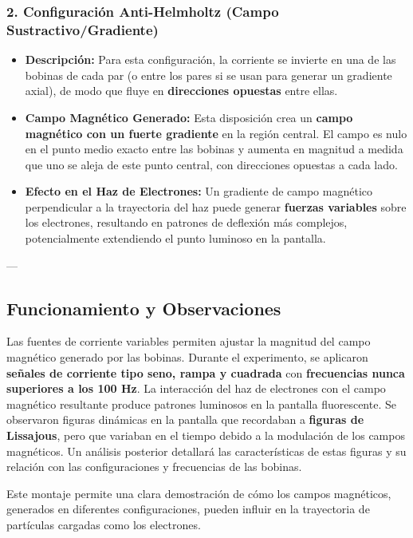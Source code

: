 \subsubsection{2. Configuración Anti-Helmholtz (Campo Sustractivo/Gradiente)}
\begin{itemize}
    \item \textbf{Descripción:} Para esta configuración, la corriente se invierte en una de las bobinas de cada par (o entre los pares si se usan para generar un gradiente axial), de modo que fluye en \textbf{direcciones opuestas} entre ellas.
    \item \textbf{Campo Magnético Generado:} Esta disposición crea un \textbf{campo magnético con un fuerte gradiente} en la región central. El campo es nulo en el punto medio exacto entre las bobinas y aumenta en magnitud a medida que uno se aleja de este punto central, con direcciones opuestas a cada lado.
    \item \textbf{Efecto en el Haz de Electrones:} Un gradiente de campo magnético perpendicular a la trayectoria del haz puede generar \textbf{fuerzas variables} sobre los electrones, resultando en patrones de deflexión más complejos, potencialmente extendiendo el punto luminoso en la pantalla.
\end{itemize}

---

\subsection{Funcionamiento y Observaciones}
Las fuentes de corriente variables permiten ajustar la magnitud del campo magnético generado por las bobinas. Durante el experimento, se aplicaron \textbf{señales de corriente tipo seno, rampa y cuadrada} con \textbf{frecuencias nunca superiores a los 100 Hz}. La interacción del haz de electrones con el campo magnético resultante produce patrones luminosos en la pantalla fluorescente. Se observaron figuras dinámicas en la pantalla que recordaban a \textbf{figuras de Lissajous}, pero que variaban en el tiempo debido a la modulación de los campos magnéticos. Un análisis posterior detallará las características de estas figuras y su relación con las configuraciones y frecuencias de las bobinas.

Este montaje permite una clara demostración de cómo los campos magnéticos, generados en diferentes configuraciones, pueden influir en la trayectoria de partículas cargadas como los electrones.